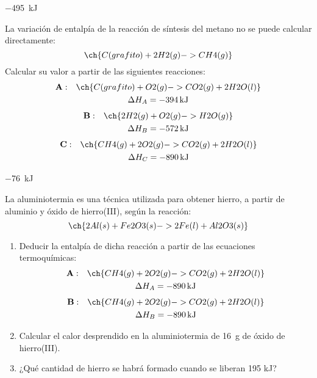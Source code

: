   \begin{solution}
    \SI{-495}{\kilo\joule}
  \end{solution}




  \begin{exercise}[
      tags    = {termodinámica, entalpía, ley de Hess},
      topics  = {química, termoquímica, termodinámica},
      source  = {},
    ]
    La variación de entalpía de la reacción de síntesis del metano no se puede calcular directamente:
    \[ \ch{C(grafito) + 2 H2(g) -> CH4(g)}  \]
    Calcular su valor a partir de las siguientes reacciones:
    \begin{multline*}
      \mathbf{A:} \quad \ch{C(grafito) + O2(g) -> CO2(g) + 2 H2O(l)} \\
      \Delta H_A = \SI{-394}{\kilo\joule}
    \end{multline*}
    \begin{multline*}
      \mathbf{B:} \quad \ch{2 H2(g) + O2(g)-> H2O(g)} \\
      \Delta H_B = \SI{-572}{\kilo\joule}
    \end{multline*}
    \begin{multline*}
      \mathbf{C:} \quad \ch{CH4(g) + 2 O2(g) -> CO2(g) + 2 H2O(l)} \\
      \Delta H_C = \SI{-890}{\kilo\joule}
    \end{multline*}
  \end{exercise}

  \begin{solution}
    \SI{-76}{\kilo\joule}
  \end{solution}




  \begin{exercise}[
      tags    = {termodinámica, entalpía, ley de Hess},
      topics  = {química, termoquímica, termodinámica},
      source  = {},
    ]
    La aluminiotermia es una técnica utilizada para obtener hierro, a partir de aluminio y óxido de hierro(III), según la reacción:
    \[ \ch{2 Al(s) + Fe2O3(s) -> 2 Fe(l) + Al2O3(s)} \]
    \begin{enumerate}
      \item Deducir la entalpía de dicha reacción a partir de las ecuaciones termoquímicas:
        \begin{multline*}
          \mathbf{A:} \quad \ch{CH4(g) + 2 O2(g) -> CO2(g) + 2 H2O(l)} \\
          \Delta H_A = \SI{-890}{\kilo\joule}
        \end{multline*}
        \begin{multline*}
          \mathbf{B:} \quad \ch{CH4(g) + 2 O2(g) -> CO2(g) + 2 H2O(l)} \\
          \Delta H_B = \SI{-890}{\kilo\joule}
        \end{multline*}
      \item Calcular el calor desprendido en la aluminiotermia de \SI{16}{\gram} de óxido de hierro(III).
      \item ¿Qué cantidad de hierro se habrá formado cuando se liberan 195 kJ?
    \end{enumerate}
  \end{exercise}

